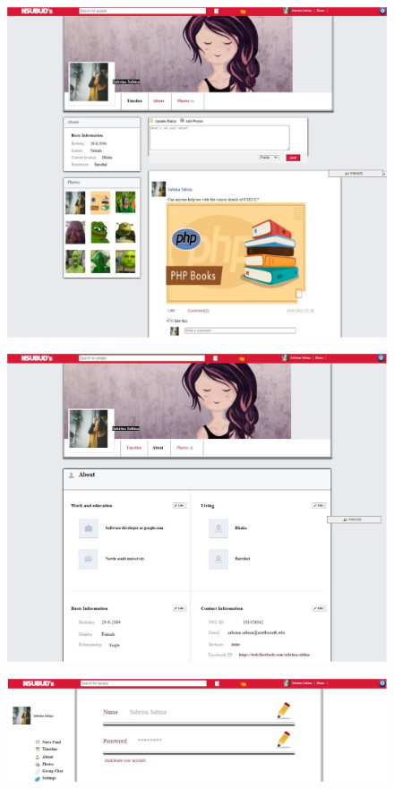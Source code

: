 {{\begin{figure}[ht]
\includegraphics[width=18cm]{images/screenshot3.png}
\label{fig:graph}
\end{figure}
\newpage
\begin{figure}[ht]
\includegraphics[width=18cm]{images/screenshot4.png}
\label{fig:graph}
\end{figure}
\newpage
\begin{figure}[ht]
\includegraphics[width=18cm]{images/screenshot5.png}

\end{figure}}}
